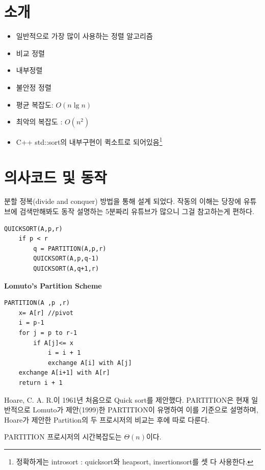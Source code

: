 
\section{소개}

\begin{itemize}
    \item 일반적으로 가장 많이 사용하는 정렬 알고리즘
    \item 비교 정렬
    \item 내부정렬
    \item 불안정 정렬
    \item 평균 복잡도: $O(n \lg n)$
    \item 최악의 복잡도 : $O(n^2)$
    \item C++ std::sort의 내부구현이 퀵소트로 되어있음\footnote{정확하게는 introsort : quicksort와 heapsort, insertionsort를 셋 다 사용한다.}
\end{itemize}

\section{의사코드 및 동작}

분할 정복(divide and conquer) 방법을 통해 설계 되었다.
작동의 이해는 당장에 유튜브에 검색만해봐도 동작 설명하는 5분짜리 유튜브가 많으니 그걸 참고하는게 편하다.

\begin{lstlisting}[style = CStyle]    
QUICKSORT(A,p,r)
    if p < r
        q = PARTITION(A,p,r)
        QUICKSORT(A,p,q-1)
        QUICKSORT(A,q+1,r)
\end{lstlisting}

\textbf{Lomuto’s Partition Scheme}
\begin{lstlisting}[style = CStyle]
PARTITION(A ,p ,r)
    x= A[r] //pivot
    i = p-1
    for j = p to r-1
        if A[j]<= x
            i = i + 1
            exchange A[i] with A[j]
    exchange A[i+1] with A[r]
    return i + 1
\end{lstlisting}

Hoare, C. A. R.이 1961년 처음으로 Quick sort를 제안했다. PARTITION은 현재 일반적으로 Lomuto가 제안(1999)한 PARTITION이 유명하여 이를 기준으로 설명하며, Hoare가 제안한 Partition의 두 프로시저의 비교는 후에 따로 다룬다.


PARTITION 프로시저의 시간복잡도는 $\Theta(n)$이다.

